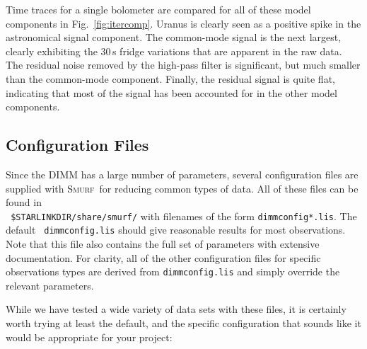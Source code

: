 \documentclass[twoside,11pt]{article}
\newcommand{\xref}[3]{#1}
\newcommand{\xlabel}[1]{}
\renewcommand{\_}{\texttt{\symbol{95}}}
\newcommand{\smurf}{\xref{\textsc{Smurf}}{sun258}{}}
\begin{document}
Time traces for a single bolometer are compared for all of these model
components in Fig.~\ref{fig:itercomp}. Uranus is clearly seen as a
positive spike in the astronomical signal component. The common-mode
signal is the next largest, clearly exhibiting the 30\,s fridge
variations that are apparent in the raw data. The residual noise
removed by the high-pass filter is significant, but much smaller than
the common-mode component. Finally, the residual signal is quite flat,
indicating that most of the signal has been accounted for in the other
model components.

\subsection{\xlabel{config}Configuration Files}
\label{sec:config}

Since the DIMM has a large number of parameters, several configuration
files are supplied with \smurf\ for reducing common types of data. All
of these files can be found in \\ \texttt{
  \$STARLINK\_DIR/share/smurf/} with filenames of the form
\texttt{dimmconfig*.lis}. The default \texttt{ dimmconfig.lis} should
give reasonable results for most observations. Note that this file
also contains the full set of parameters with extensive
documentation. For clarity, all of the other configuration files for
specific observations types are derived from \texttt{dimmconfig.lis}
and simply override the relevant parameters.

While we have tested a wide variety of data sets with these files, it
is certainly worth trying at least the default, and the specific
configuration that sounds like it would be appropriate for your
project:
\end{document}
